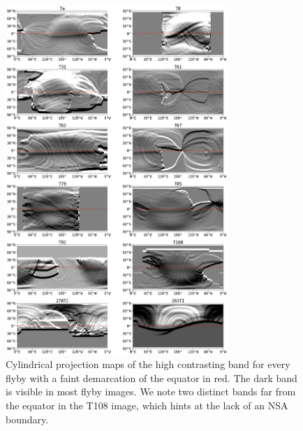 \documentclass[apj,tighten]{emulateapj}
\begin{document}
\begin{figure}[tbhp]
\centering
\includegraphics[width=0.75\textwidth]{figures/hc_bands6.png}
\caption{\footnotesize Cylindrical projection maps of the high contrasting band for every flyby with a faint demarcation of the equator in red.
The dark band is visible in most flyby images.
We note two distinct bands far from the equator in the T108 image, which hints at the lack of an NSA boundary.
\label{figure:hc_bands4}}
\end{figure}
\end{document}

